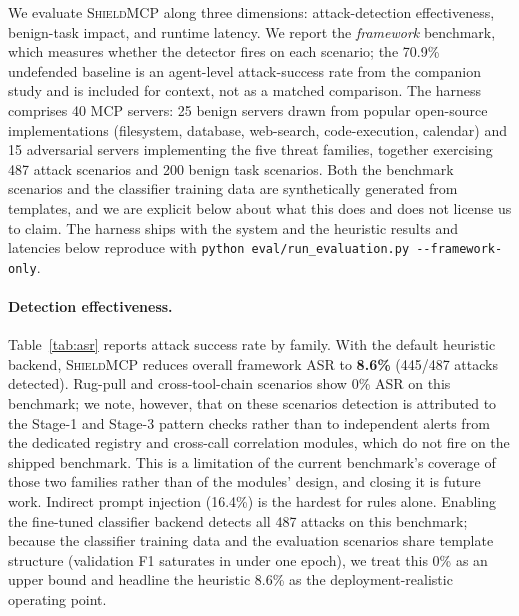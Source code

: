 \documentclass[11pt]{article}
\newcommand{\shield}{\textsc{ShieldMCP}}
\begin{document}
We evaluate \shield{} along three dimensions: attack-detection effectiveness,
benign-task impact, and runtime latency. We report the \emph{framework} benchmark,
which measures whether the detector fires on each scenario; the 70.9\% undefended
baseline is an agent-level attack-success rate from the companion study
\citep{yergattikar2026securing} and is
included for context, not as a matched comparison. The harness comprises 40 MCP
servers: 25 benign servers drawn from popular open-source implementations
(filesystem, database, web-search, code-execution, calendar) and 15 adversarial
servers implementing the five threat families, together exercising 487 attack
scenarios and 200 benign task scenarios. Both the benchmark scenarios and the
classifier training data are synthetically generated from templates, and we are
explicit below about what this does and does not license us to claim. The harness
ships with the system and the heuristic results and latencies below reproduce with
\texttt{python eval/run\_evaluation.py -\/-framework-only}.

\paragraph{Detection effectiveness.}
Table~\ref{tab:asr} reports attack success rate by family. With the default heuristic
backend, \shield{} reduces overall framework ASR to \textbf{8.6\%} (445/487 attacks
detected). Rug-pull and cross-tool-chain scenarios show 0\% ASR on this benchmark;
we note, however, that on these scenarios detection is attributed to the Stage-1 and
Stage-3 pattern checks rather than to independent alerts from the dedicated registry
and cross-call correlation modules, which do not fire on the shipped benchmark. This
is a limitation of the current benchmark's coverage of those two families rather than
of the modules' design, and closing it is future work. Indirect prompt injection
(16.4\%) is the hardest for rules alone. Enabling the fine-tuned classifier backend
detects all 487 attacks on this benchmark; because the classifier training data and
the evaluation scenarios share template structure (validation F1 saturates in under
one epoch), we treat this 0\% as an upper bound and headline the heuristic 8.6\% as
the deployment-realistic operating point.
\end{document}
